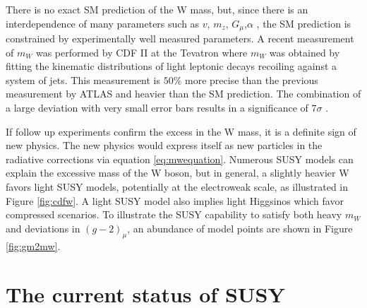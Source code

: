 There is no exact SM prediction of the W mass, but, since there is an interdependence of many parameters such as $v$, $m_z$, $G_\mu$,$\alpha$ , the SM prediction is constrained by experimentally well measured parameters. A recent measurement of $m_W$ was performed by CDF II at the Tevatron where $m_W$ was obtained by fitting the kinematic distributions of light leptonic decays recoiling against a system of jets. This measurement is $50\%$ more precise than the previous measurement by ATLAS and heavier than the SM prediction. The combination of a large deviation with very small error bars results in a significance of $7\sigma$ \cite{CDF:2022hxs}.  

If follow up experiments confirm the excess in the W mass, it is a definite sign of new physics. The new physics would express itself as new particles in the radiative corrections via equation \ref{eq:mwequation}. Numerous SUSY models can explain the excessive mass of the W boson, but in general, a slightly heavier W favors light SUSY models, potentially at the electroweak scale, as illustrated in Figure \ref{fig:cdfw}. A light SUSY model also implies light Higgsinos which favor compressed scenarios.  To illustrate the SUSY capability to satisfy both heavy $m_W$ and deviations in $(g-2)_\mu$, an abundance of model points are shown in Figure \ref{fig:gm2mw}.
\section{The current status of SUSY}

